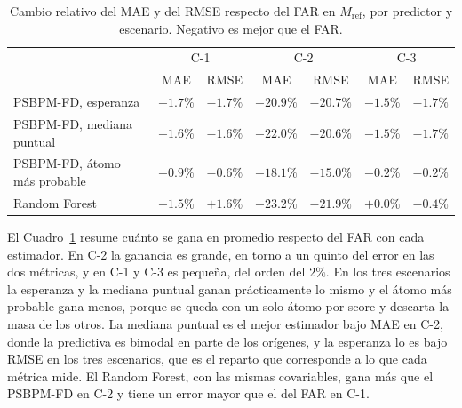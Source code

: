 \begin{table}[H]
\centering\footnotesize
\setlength{\tabcolsep}{4pt}
\caption{Cambio relativo del MAE y del RMSE respecto del FAR en $M_{\mathrm{ref}}$, por predictor y escenario. Negativo es mejor que el FAR.}
\label{tab:res_bloqueA_ganancia}
\begin{tabular}{l cc cc cc}
\hline
 & \multicolumn{2}{c}{C-1} & \multicolumn{2}{c}{C-2} & \multicolumn{2}{c}{C-3} \\
 & MAE & RMSE & MAE & RMSE & MAE & RMSE \\
\hline
PSBPM-FD, esperanza & $-1.7\%$ & $-1.7\%$ & $-20.9\%$ & $-20.7\%$ & $-1.5\%$ & $-1.7\%$ \\
PSBPM-FD, mediana puntual & $-1.6\%$ & $-1.6\%$ & $-22.0\%$ & $-20.6\%$ & $-1.5\%$ & $-1.7\%$ \\
PSBPM-FD, átomo más probable & $-0.9\%$ & $-0.6\%$ & $-18.1\%$ & $-15.0\%$ & $-0.2\%$ & $-0.2\%$ \\
Random Forest & $+1.5\%$ & $+1.6\%$ & $-23.2\%$ & $-21.9\%$ & $+0.0\%$ & $-0.4\%$ \\
\hline
\end{tabular}
\end{table}

El Cuadro~\ref{tab:res_bloqueA_ganancia} resume cuánto se gana en promedio respecto del FAR con cada estimador. En C-2 la ganancia es grande, en torno a un quinto del error en las dos métricas, y en C-1 y C-3 es pequeña, del orden del $2\%$. En los tres escenarios la esperanza y la mediana puntual ganan prácticamente lo mismo y el átomo más probable gana menos, porque se queda con un solo átomo por score y descarta la masa de los otros. La mediana puntual es el mejor estimador bajo MAE en C-2, donde la predictiva es bimodal en parte de los orígenes, y la esperanza lo es bajo RMSE en los tres escenarios, que es el reparto que corresponde a lo que cada métrica mide. El Random Forest, con las mismas covariables, gana más que el PSBPM-FD en C-2 y tiene un error mayor que el del FAR en C-1.


